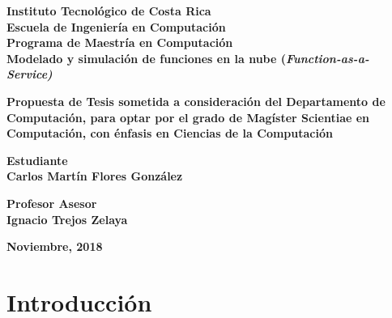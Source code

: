 \documentclass[12pt, twoside]{report}
\begin{document}
\thispagestyle{plain}
\begin{titlepage}
	\begin{center}
        {\fontsize{24}{28}\selectfont \textbf{Instituto Tecnológico de Costa Rica}\\}
        \vspace{1cm}
        {\fontsize{20}{24}\selectfont \textbf{Escuela de Ingeniería en Computación}\\}
        {\fontsize{18}{22}\selectfont \textbf{Programa de Maestría en Computación}\\}
        \vspace{2cm}
        {\fontsize{20}{24}\selectfont \textbf{Modelado y simulación de funciones en la nube (\textit{Function-as-a-Service)}}}        
    
    
        \vspace{2cm}
        {\fontsize{14}{17}\selectfont \textbf{Propuesta de Tesis sometida a consideración del Departamento de Computación, para optar por el grado de Magíster Scientiae en Computación, con énfasis en Ciencias de la Computación
}}
        
       \vspace{1.5cm}
       {\fontsize{14}{17}\selectfont \textbf{Estudiante\\ Carlos Martín Flores González}} 
       
       \vspace{1cm}
       {\fontsize{14}{17}\selectfont \textbf{Profesor Asesor\\ Ignacio Trejos Zelaya}}
       
       \vspace{1.5cm}
       {\fontsize{14}{17}\selectfont \textbf{Noviembre, 2018}}                       
        
    \end{center}
\end{titlepage}

{} 
\renewcommand*\contentsname{Indice}
\tableofcontents
\listoffigures
\listoftables

\chapter{Introducción}

\end{document}
